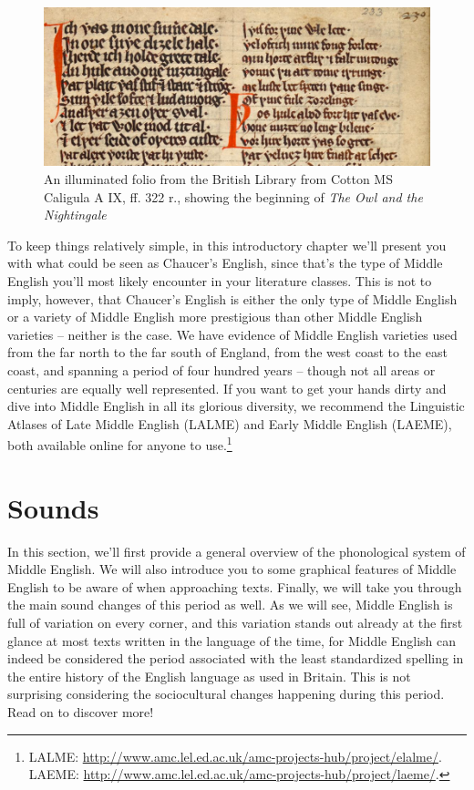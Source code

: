 \begin{figure}
    \includegraphics[scale=0.36]{chapters/img/OwlNightingale.png}
    \caption{An illuminated folio from the British Library from Cotton MS Caligula A IX, ff. 322 r., showing the beginning of \textit{The Owl and the Nightingale}}
    \label{fig:owl-folio}
\end{figure}

To keep things relatively simple, in this introductory chapter we'll present you with what could be seen as Chaucer's English, since that's the type of Middle English you'll most likely encounter in your literature classes. This is not to imply, however, that Chaucer's English is either the only type of Middle English or a variety of Middle English more prestigious than other Middle English varieties -- neither is the case. We have evidence of Middle English varieties used from the far north to the far south of England, from the west coast to the east coast, and spanning a period of four hundred years -- though not all areas or centuries are equally well represented. If you want to get your hands dirty and dive into Middle English in all its glorious diversity, we recommend the Linguistic Atlases of Late Middle English (LALME) and Early Middle English (LAEME), both available online for anyone to use.\footnote{LALME: \url{http://www.amc.lel.ed.ac.uk/amc-projects-hub/project/elalme/}. LAEME: \url{http://www.amc.lel.ed.ac.uk/amc-projects-hub/project/laeme/}.}

\section{Sounds}
In this section, we'll first provide a general overview of the phonological system of Middle English. We will also introduce you to some graphical features of Middle English to be aware of when approaching texts. Finally, we will take you through the main sound changes of this period as well. As we will see, Middle English is full of variation on every corner, and this variation stands out already at the first glance at most texts written in the language of the time, for Middle English can indeed be considered the period associated with the least standardized spelling in the entire history of the English language as used in Britain. This is not surprising considering the sociocultural changes happening during this period. Read on to discover more!

